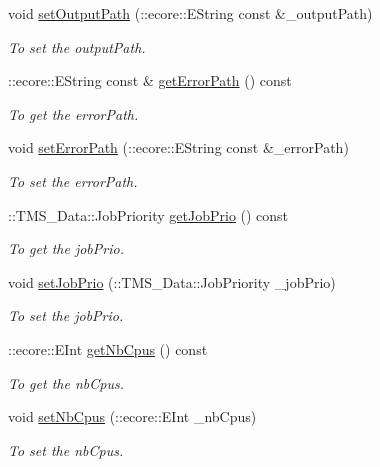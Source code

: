 \begin{DoxyCompactItemize}
void \hyperlink{classTMS__Data_1_1Job_ac655716887bc6d90767fc1e3e52e7439}{setOutputPath} (::ecore::EString const \&\_\-outputPath)
\begin{DoxyCompactList}\small\item\em To set the outputPath. \item\end{DoxyCompactList}\item 
::ecore::EString const \& \hyperlink{classTMS__Data_1_1Job_acd3cfb0f6b89530873dbe685b4822766}{getErrorPath} () const 
\begin{DoxyCompactList}\small\item\em To get the errorPath. \item\end{DoxyCompactList}\item 
void \hyperlink{classTMS__Data_1_1Job_ae06bb71fa1e53f2c5efc857f7946ce74}{setErrorPath} (::ecore::EString const \&\_\-errorPath)
\begin{DoxyCompactList}\small\item\em To set the errorPath. \item\end{DoxyCompactList}\item 
::TMS\_\-Data::JobPriority \hyperlink{classTMS__Data_1_1Job_a96f90848f1e5f7955bdeab4c6a0ca22b}{getJobPrio} () const 
\begin{DoxyCompactList}\small\item\em To get the jobPrio. \item\end{DoxyCompactList}\item 
void \hyperlink{classTMS__Data_1_1Job_a61ab8ca18d4afbeeb2fafd537e6bdec8}{setJobPrio} (::TMS\_\-Data::JobPriority \_\-jobPrio)
\begin{DoxyCompactList}\small\item\em To set the jobPrio. \item\end{DoxyCompactList}\item 
::ecore::EInt \hyperlink{classTMS__Data_1_1Job_a45a3867ead7601df0dc172204eb25270}{getNbCpus} () const 
\begin{DoxyCompactList}\small\item\em To get the nbCpus. \item\end{DoxyCompactList}\item 
void \hyperlink{classTMS__Data_1_1Job_ad99912b5fb01cc67d5185be83051f16d}{setNbCpus} (::ecore::EInt \_\-nbCpus)
\begin{DoxyCompactList}\small\item\em To set the nbCpus. \item\end{DoxyCompactList}\item 

\end{DoxyCompactItemize}
